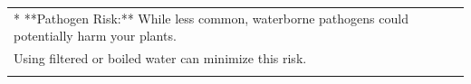 \begin{table}[ht]
\begin{tabular}{p{13cm}}
* **Pathogen Risk:** While less common, waterborne pathogens could potentially harm your plants. \\
Using filtered or boiled water can minimize this risk. \\
\\
\bottomrule
\end{tabular}






\label{tab:example_sustainable_living_reason}
\end{table}